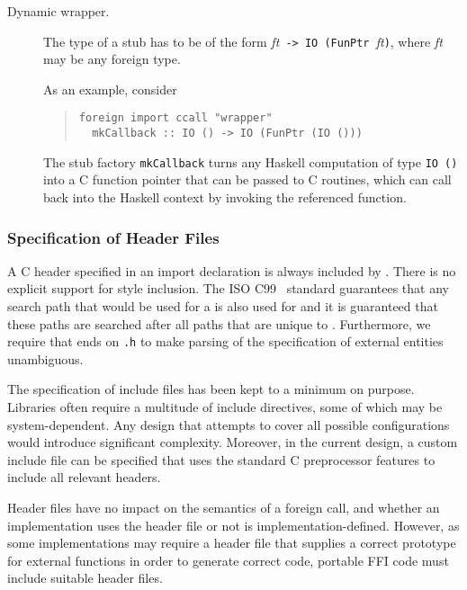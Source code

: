 \documentclass[a4paper,twoside]{article}
\newcommand{\code}[1]{\texttt{#1}}      %
\begin{document}
\begin{description}
\item[Dynamic wrapper.]  The type of a  stub has to be of the
  form \textit{ft}\code{ -> }\code{IO (FunPtr }\textit{ft}\code), where
  \textit{ft} may be any foreign type.

  As an example, consider
  \begin{quote}
\begin{verbatim}
foreign import ccall "wrapper" 
  mkCallback :: IO () -> IO (FunPtr (IO ()))
\end{verbatim}
  \end{quote}
  The stub factory \code{mkCallback} turns any Haskell computation of type
  \code{IO ()} into a C function pointer that can be passed to C routines,
  which can call back into the Haskell context by invoking the referenced
  function.

\end{description}

\subsubsection{Specification of Header Files}

A C header specified in an import declaration is always included by
.  There is no explicit support for
 style inclusion.  The ISO C99~\cite{C99}
standard guarantees that any search path that would be used for a
 is also used for  and it is guaranteed that these paths are searched after
all paths that are unique to .  Furthermore,
we require that  ends on \code{.h} to make parsing of the
specification of external entities unambiguous.
  
The specification of include files has been kept to a minimum on purpose.
Libraries often require a multitude of include directives, some of which may
be system-dependent.  Any design that attempts to cover all possible
configurations would introduce significant complexity.  Moreover, in the
current design, a custom include file can be specified that uses the standard
C preprocessor features to include all relevant headers.

Header files have no impact on the semantics of a foreign call, and whether an
implementation uses the header file or not is implementation-defined.
However, as some implementations may require a header file that supplies a
correct prototype for external functions in order to generate correct code,
portable FFI code must include suitable header files.
\end{document}
